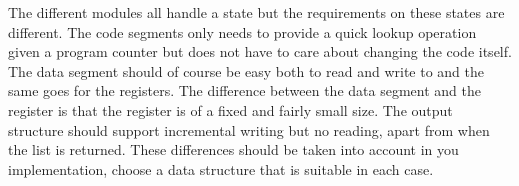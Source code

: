 \documentclass[a4paper,11pt]{article}
\begin{document}
 The different modules all handle a state but the requirements on
 these states are different. The code segments only needs to provide a
 quick lookup operation given a program counter but does not have to
 care about changing the code itself. The data segment should of
 course be easy both to read and write to and the same goes for the
 registers. The difference between the data segment and the register is
 that the register is of a fixed and fairly small size. The output
 structure should support incremental writing but no reading, apart
 from when the list is returned. These differences should be taken
 into account in you implementation, choose a data structure that is
 suitable in each case.
\end{document}
